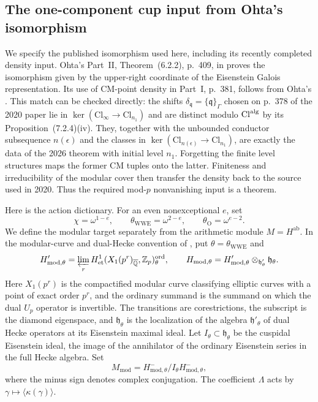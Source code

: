 \documentclass[11pt]{article}
\theoremstyle{definition}\newtheorem{definition}[theorem]{Definition}
\begin{document}
\subsection{The one-component cup input from Ohta's isomorphism}
\label{subsec:ohta-component-gate}

We specify the published isomorphism used here, including its recently
completed density input.  Ohta's Part~II, Theorem~(6.2.2), p.~409, in \cite{Ohta2020} proves the isomorphism given
by the upper-right coordinate of the Eisenstein Galois representation.
Its use of CM-point density in Part~I, p.~381, follows from Ohta's \cite[Theorem~(2.3.4), author pp.~15--16]{OhtaDensity}.  This match can be checked directly: the shifts
$\delta_{\mathfrak q}=\{\mathfrak q\}_\Gamma$ chosen on p.~378 of the
2020 paper lie in $\ker(\mathrm{Cl}_\infty\to\mathrm{Cl}_{n_1})$ and
are distinct modulo $\mathrm{Cl}^{\rm alg}$ by its
Proposition~(7.2.4)(iv).  They, together with the unbounded conductor
subsequence $n(\epsilon)$ and the classes in
$\ker(\mathrm{Cl}_{n(\epsilon)}\to\mathrm{Cl}_{n_1})$, are exactly the
data of the 2026 theorem with initial level $n_1$.  Forgetting the
finite level structures maps the former CM tuples onto the latter.
Finiteness and irreducibility of the modular cover then transfer the
density back to the source used in 2020.  Thus the required mod-$p$
nonvanishing input is a theorem.

Here is the action dictionary.  For an even nonexceptional $e$, set
\[
 \chi=\omega^{1-e},\qquad
 \theta_{\mathrm{WWE}}=\omega^{2-e},\qquad
 \theta_{\mathrm O}=\omega^{e-2}.
\]
We define the modular target separately from the arithmetic module
$M=H^{\mathrm{ab}}$.  In the modular-curve and dual-Hecke convention of
\cite[\S3.1]{WWEPseudo}, put $\theta=\theta_{\mathrm{WWE}}$ and
\[
 H'_{\mathrm{mod},\theta}
 =\varprojlim_r H^1_{\mathrm{et}}
   (X_1(p^r)_{\overline{\mathbb Q}},\mathbb Z_p)^{\mathrm{ord}}_\theta,
 \qquad
 H_{\mathrm{mod},\theta}
 =H'_{\mathrm{mod},\theta}\otimes_{\mathfrak h'_\theta}\mathfrak h_\theta.
\]
Here $X_1(p^r)$ is the compactified modular curve classifying
elliptic curves with a point of exact order $p^r$, and the ordinary
summand is the summand on which the dual $U_p$ operator is invertible.
The transitions are corestrictions, the subscript is the diamond
eigenspace, and $\mathfrak h_\theta$ is the localization of the algebra
$\mathfrak h'_\theta$ of dual Hecke operators at its Eisenstein maximal
ideal.  Let $I_\theta\subset\mathfrak h_\theta$ be the cuspidal Eisenstein
ideal, the image of the annihilator of the ordinary Eisenstein series
in the full Hecke algebra.  Set
\[
 M_{\mathrm{mod}}
 =H^-_{\mathrm{mod},\theta}/I_\theta H^-_{\mathrm{mod},\theta},
\]
where the minus sign denotes complex conjugation.  The coefficient
$\Lambda$ acts by $\gamma\mapsto\langle\kappa(\gamma)\rangle$.
\end{document}
